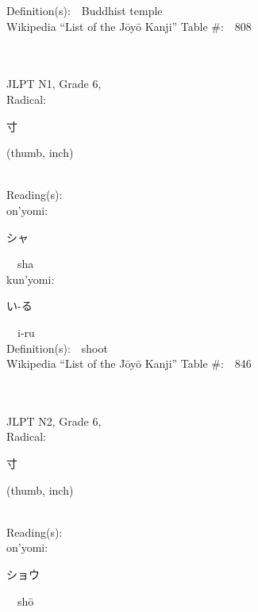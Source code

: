 \begin{multicols}{2}
Definition(s):\ \ Buddhist temple \\
Wikipedia ``List of the J\=oy\=o Kanji'' Table \#:\ \ 808 \\
\ \ \\
{\fontsize{34pt}{40pt}  }\ \ \\  %
{JLPT N1, Grade 6, \\Radical:\ \ {\begin{CJK}{UTF8}{min} 寸 \end{CJK}} (thumb, inch) } \\
Reading(s):\ \ \\
{\hspace*{1em}}on'yomi:\ \ \\
{\hspace*{2em}}{\begin{CJK}{UTF8}{min} シャ \end{CJK}}\ \ sha\ \ \\
{\hspace*{1em}}kun'yomi:\ \ \\
{\hspace*{2em}}{\begin{CJK}{UTF8}{min} い-る \end{CJK}}\ \ i-ru\ \ \\
Definition(s):\ \ shoot \\
Wikipedia ``List of the J\=oy\=o Kanji'' Table \#:\ \ 846 \\
\ \ \\
{\fontsize{34pt}{40pt}  }\ \ \\  %
{JLPT N2, Grade 6, \\Radical:\ \ {\begin{CJK}{UTF8}{min} 寸 \end{CJK}} (thumb, inch) } \\
Reading(s):\ \ \\
{\hspace*{1em}}on'yomi:\ \ \\
{\hspace*{2em}}{\begin{CJK}{UTF8}{min} ショウ \end{CJK}}\ \ sh\=o\ \ \\

\end{multicols}
